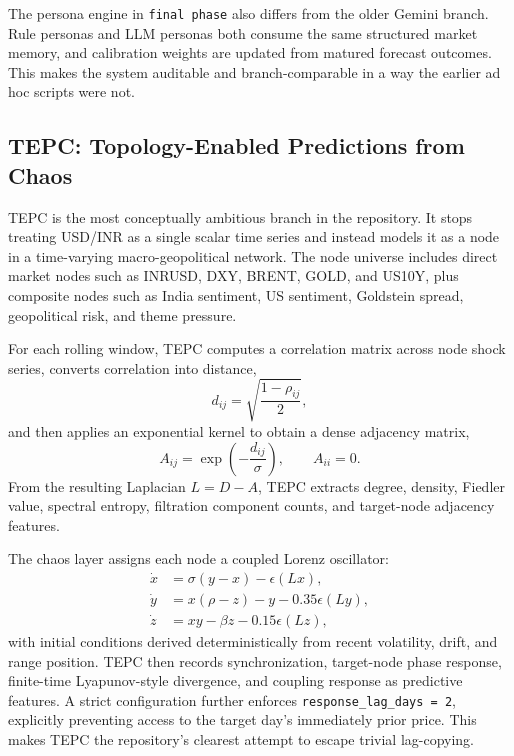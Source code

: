 \documentclass[11pt,a4paper]{article}
\begin{document}
The persona engine in \texttt{final phase} also differs from the older Gemini branch. Rule personas and LLM personas both consume the same structured market memory, and calibration weights are updated from matured forecast outcomes. This makes the system auditable and branch-comparable in a way the earlier ad hoc scripts were not.

\subsection{TEPC: Topology-Enabled Predictions from Chaos}

TEPC is the most conceptually ambitious branch in the repository. It stops treating USD/INR as a single scalar time series and instead models it as a node in a time-varying macro-geopolitical network. The node universe includes direct market nodes such as INRUSD, DXY, BRENT, GOLD, and US10Y, plus composite nodes such as India sentiment, US sentiment, Goldstein spread, geopolitical risk, and theme pressure.

For each rolling window, TEPC computes a correlation matrix across node shock series, converts correlation into distance,
\begin{equation}
d_{ij} = \sqrt{\frac{1 - \rho_{ij}}{2}},
\end{equation}
and then applies an exponential kernel to obtain a dense adjacency matrix,
\begin{equation}
A_{ij} = \exp\!\left(-\frac{d_{ij}}{\sigma}\right), \qquad A_{ii}=0.
\end{equation}
From the resulting Laplacian $L = D - A$, TEPC extracts degree, density, Fiedler value, spectral entropy, filtration component counts, and target-node adjacency features.

The chaos layer assigns each node a coupled Lorenz oscillator:
\begin{align}
\dot{x} &= \sigma(y - x) - \epsilon(Lx), \\
\dot{y} &= x(\rho - z) - y - 0.35\epsilon(Ly), \\
\dot{z} &= xy - \beta z - 0.15\epsilon(Lz),
\end{align}
with initial conditions derived deterministically from recent volatility, drift, and range position. TEPC then records synchronization, target-node phase response, finite-time Lyapunov-style divergence, and coupling response as predictive features. A strict configuration further enforces \texttt{response\_lag\_days = 2}, explicitly preventing access to the target day's immediately prior price. This makes TEPC the repository's clearest attempt to escape trivial lag-copying.
\end{document}
